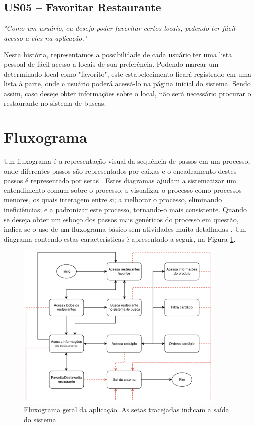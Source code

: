 \subsection{US05 -- Favoritar Restaurante}

\textit{"Como um usuário, eu desejo poder favoritar certos locais, podendo ter fácil acesso a eles na aplicação."}

Nesta história, representamos a possibilidade de cada usuário ter uma lista pessoal de fácil acesso a locais de sua preferência. Podendo marcar um determinado local como "favorito", este estabelecimento ficará registrado em uma lista à parte, onde o usuário poderá acessá-lo na página inicial do sistema. Sendo assim, caso deseje obter informações sobre o local, não será necessário procurar o restaurante no sistema de buscas.

\section{Fluxograma}
Um fluxograma é a representação visual da sequência de passos em um processo, onde diferentes passos são representados por caixas e o encadeamento destes passos é representado por setas \cite{REYNARD1995}. Estes diagramas ajudam a sistematizar um entendimento comum sobre o processo; a visualizar o processo como processos menores, os quais interagem entre si; a melhorar o processo, eliminando ineficiências; e a padronizar este processo, tornando-o mais consistente. Quando se deseja obter um esboço dos passos mais genéricos do processo em questão, indica-se o uso de um fluxograma básico sem atividades muito detalhadas \cite{REYNARD1995}. Um diagrama contendo estas características é apresentado a seguir, na Figura \ref{fig:fluxograma}.

\begin{figure}[H]
    \centering
    \caption[Fluxograma Geral do Sistema]{\label{fig:fluxograma}Fluxograma geral da aplicação. As setas tracejadas indicam a saída do sistema}
    \includegraphics[width=0.9\textwidth]{./pdf/fluxograma-atual.pdf}
\end{figure}


